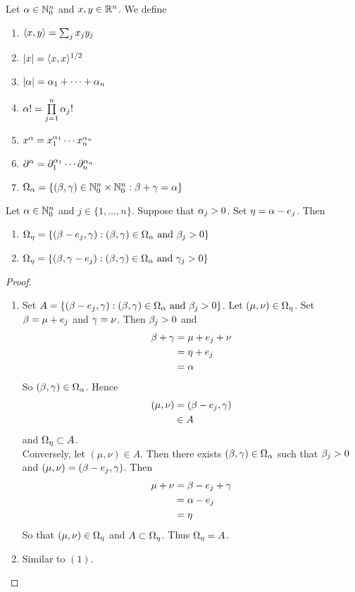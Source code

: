 \documentclass{book}
\begin{document}
	\begin{defn}
		 Let $\alpha \in \mathbb{N}_0^n$ and $x, y \in \mathbb{R}^n$. We define 
		\begin{enumerate}
			\item $\langle x , y\rangle  = \sum_{j}x_jy_j$
			\item $|x| = \langle x, x\rangle^{1/2}$
			\item $|\alpha| = \alpha_1 + \cdots + \alpha_n$
			\item $\alpha! = \prod\limits_{j=1}^n \alpha_j!$
			\item $x^\alpha = x_1^{\alpha_1}\cdots x_n^{\alpha_n}$
			\item $\partial^{\alpha} = \partial_1^{\alpha_1} \cdots \partial_n^{\alpha_n}$
			\item $\Omega_{\alpha} = \{(\beta, \gamma) \in \mathbb{N}_0^n \times \mathbb{N}_0^n: \beta + \gamma = \alpha\}$
		\end{enumerate}
	\end{defn}

	\begin{ex}
		Let $\alpha \in \mathbb{N}_0^n$ and $j \in \{1, \ldots, n\}$. Suppose that $\alpha_j > 0$. Set $\eta = \alpha - e_j$. Then 
		\begin{enumerate}
			\item $\Omega_{\eta} = \{(\beta - e_j, \gamma): (\beta, \gamma) \in \Omega_{\alpha} \text{ and } \beta_j > 0\}$
			\item $\Omega_{\eta} = \{(\beta, \gamma - e_j): (\beta, \gamma) \in \Omega_{\alpha} \text{ and } \gamma_j > 0\}$
		\end{enumerate}
	\end{ex}

	\begin{proof}\
		\begin{enumerate}
			\item Set $A = \{(\beta - e_j, \gamma): (\beta, \gamma) \in \Omega_{\alpha} \text{ and } \beta_j > 0\}$. Let $(\mu, \nu) \in \Omega_{\eta}$. Set $\beta = \mu + e_j$ and $\gamma = \nu$. Then $\beta_j > 0$ and 
			\begin{align*}
				\beta + \gamma 
				& = \mu + e_j + \nu \\
				& = \eta + e_j \\
				& = \alpha 
			\end{align*}
			So $(\beta, \gamma) \in \Omega_{\alpha}$. Hence
			\begin{align*}
				(\mu, \nu) 
				& = (\beta - e_j, \gamma) \\
				& \in A
			\end{align*}
			and $\Omega_{\eta} \subset A$. \\
			Conversely, let $(\mu, \nu) \in A$. Then there exists $(\beta, \gamma) \in \Omega_{\alpha}$ such that $\beta_j > 0$ and $(\mu, \nu) = (\beta - e_j, \gamma)$. Then 
			\begin{align*}
				\mu + \nu
				&= \beta - e_j + \gamma \\
				& = \alpha - e_j \\
				& = \eta 
			\end{align*}
			So that $(\mu, \nu) \in \Omega_{\eta}$ and $A \subset \Omega_{\eta}$. Thus $\Omega_{\eta} = A$.
			\item Similar to $(1)$.
		\end{enumerate}
	\end{proof}
\end{document}
